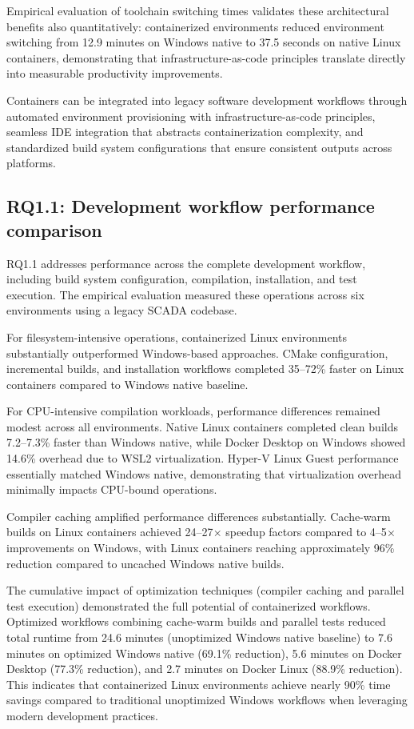 Empirical evaluation of toolchain switching times validates these architectural benefits also quantitatively: containerized environments reduced environment switching from 12.9 minutes on Windows native to 37.5 seconds on native Linux containers, demonstrating that infrastructure-as-code principles translate directly into measurable productivity improvements.

Containers can be integrated into legacy software development workflows through automated environment provisioning with infrastructure-as-code principles, seamless IDE integration that abstracts containerization complexity, and standardized build system configurations that ensure consistent outputs across platforms.

\newpage
\subsection{RQ1.1: Development workflow performance comparison}

RQ1.1 addresses performance across the complete development workflow, including build system configuration, compilation, installation, and test execution.
The empirical evaluation measured these operations across six environments using a legacy SCADA codebase.

For filesystem-intensive operations, containerized Linux environments substantially outperformed Windows-based approaches.
CMake configuration, incremental builds, and installation workflows completed 35--72\% faster on Linux containers compared to Windows native baseline.

For CPU-intensive compilation workloads, performance differences remained modest across all environments.
Native Linux containers completed clean builds 7.2--7.3\% faster than Windows native, while Docker Desktop on Windows showed 14.6\% overhead due to WSL2 virtualization.
Hyper-V Linux Guest performance essentially matched Windows native, demonstrating that virtualization overhead minimally impacts CPU-bound operations.

Compiler caching amplified performance differences substantially.
Cache-warm builds on Linux containers achieved 24--27$\times$ speedup factors compared to 4--5$\times$ improvements on Windows, with Linux containers reaching approximately 96\% reduction compared to uncached Windows native builds.

The cumulative impact of optimization techniques (compiler caching and parallel test execution) demonstrated the full potential of containerized workflows.
Optimized workflows combining cache-warm builds and parallel tests reduced total runtime from 24.6 minutes (unoptimized Windows native baseline) to 7.6 minutes on optimized Windows native (69.1\% reduction), 5.6 minutes on Docker Desktop (77.3\% reduction), and 2.7 minutes on Docker Linux (88.9\% reduction).
This indicates that containerized Linux environments achieve nearly 90\% time savings compared to traditional unoptimized Windows workflows when leveraging modern development practices.

